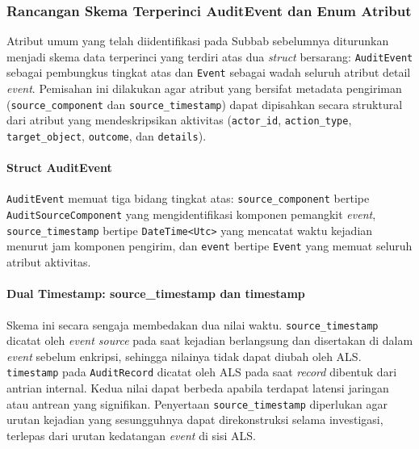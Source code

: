 
\subsubsection{Rancangan Skema Terperinci AuditEvent dan Enum Atribut}
\label{subsubsec:rancangan-skema-audit-event-detail}

Atribut umum yang telah diidentifikasi pada Subbab sebelumnya diturunkan
menjadi skema data terperinci yang terdiri atas dua \textit{struct} bersarang:
\texttt{AuditEvent} sebagai pembungkus tingkat atas dan \texttt{Event} sebagai
wadah seluruh atribut detail \textit{event}. Pemisahan ini dilakukan agar
atribut yang bersifat metadata pengiriman (\texttt{source\_component} dan
\texttt{source\_timestamp}) dapat dipisahkan secara struktural dari atribut
yang mendeskripsikan aktivitas (\texttt{actor\_id}, \texttt{action\_type},
\texttt{target\_object}, \texttt{outcome}, dan \texttt{details}).

\paragraph{Struct AuditEvent}

\texttt{AuditEvent} memuat tiga bidang tingkat atas: \texttt{source\_component}
bertipe \texttt{AuditSourceComponent} yang mengidentifikasi komponen pemangkit
\textit{event}, \texttt{source\_timestamp} bertipe \texttt{DateTime<Utc>} yang
mencatat waktu kejadian menurut jam komponen pengirim, dan \texttt{event} bertipe
\texttt{Event} yang memuat seluruh atribut aktivitas.

\paragraph{Dual Timestamp: source\_timestamp dan timestamp}

Skema ini secara sengaja membedakan dua nilai waktu. \texttt{source\_timestamp}
dicatat oleh \textit{event source} pada saat kejadian berlangsung dan disertakan
di dalam \textit{event} sebelum enkripsi, sehingga nilainya tidak dapat diubah
oleh ALS. \texttt{timestamp} pada \texttt{AuditRecord} dicatat oleh ALS pada
saat \textit{record} dibentuk dari antrian internal. Kedua nilai dapat berbeda
apabila terdapat latensi jaringan atau antrean yang signifikan. Penyertaan
\texttt{source\_timestamp} diperlukan agar urutan kejadian yang sesungguhnya
dapat direkonstruksi selama investigasi, terlepas dari urutan kedatangan
\textit{event} di sisi ALS.

